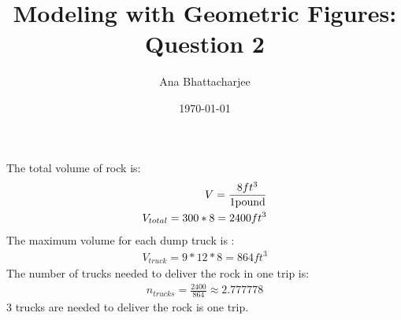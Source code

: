 \documentclass{article}
\begin{document}
\title{Modeling with Geometric Figures: Question 2}
\author{Ana Bhattacharjee}
\date{\today}
\maketitle
\begin{center}
The total volume of rock is:
\begin{align}
  V = \frac{8 ft^3}{1 \vspace{1cm}\text{pound}} \\
  V_{total} = 300 * 8 = 2400 ft^3
\end{align}
The maximum volume for each dump truck is :
\begin{align}
  V_{truck} = 9 * 12 * 8 = 864 ft^3
\end{align}
The number of trucks needed to deliver the rock in one trip is:
\begin{align}
  n_{trucks} = \frac{2400}{864} \approx 2.777778
\end{align}
3 trucks are needed to deliver the rock is one trip.
\end{center}
\end{document}
